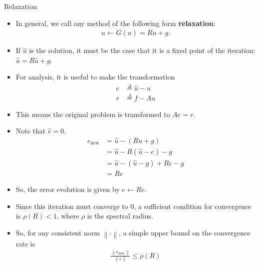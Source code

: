 \documentclass{beamer}
\providecommand{\defeq}{\stackrel{\Delta}{=}}
\providecommand{\norm}[1]{\left\lVert #1 \right\rVert}
\begin{document}
\begin{frame}[allowframebreaks]{Relaxation}
 \begin{itemize}
  \item In general, we call any method of the following form \textbf{relaxation}:
  \begin{align}
   u \leftarrow G(u) = Ru+g.
  \end{align}
  \item If $\hat{u}$ is the solution, it must be the case that it is a fixed
        point of the iteration: $\hat{u} = R\hat{u}+g$.
  \item For analysis, it is useful to make the transformation
  \begin{align}
   e &\defeq \hat{u}-u \\
   r &\defeq f-Au
  \end{align}
  \item This means the original problem is transformed to $Ae=r$.
  \item Note that $\hat{e} = 0$.
  \begin{align}
   e_{\text{new}} &= \hat{u} - (Ru+g) \\
                  &= \hat{u} - R(\hat{u}-e) - g \\
                  &= \hat{u} - (\hat{u}-g) + Re - g \\
                  &= Re
  \end{align}
  \item So, the error evolution is given by $e \leftarrow Re$.
  \item Since this iteration must converge to 0, a sufficient condition for
        convergence is $\rho(R) < 1$, where $\rho$ is the spectral radius.
  \item So, for any consistent norm $\norm{\cdot}$, a simple upper bound on the convergence rate is
  \begin{align}
   \frac{\norm{e_{\text{new}}}}{\norm{e}} \leq \rho(R)
  \end{align}
 \end{itemize}
\end{frame}
\end{document}
